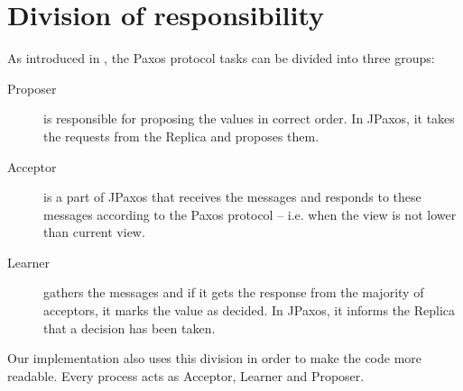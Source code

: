 
\section{Division of responsibility}

As introduced in \cite{Lam01}, the Paxos protocol tasks can be divided into three groups:
\begin{description}
 \item[Proposer] is responsible for proposing the values in correct order. In JPaxos, it takes the requests from the Replica and proposes them.
 
 \item[Acceptor] is a part of JPaxos that receives the \propose messages and responds to these messages according to the Paxos protocol -- i.e. when the view is not lower than current view.
 
 \item[Learner] gathers the \accept messages and if it gets the response from the majority of acceptors, it marks the value as decided. In JPaxos, it informs the Replica that a decision has been taken.
\end{description}

Our implementation also uses this division in order to make the code more readable. Every process acts as Acceptor, Learner and Proposer.

